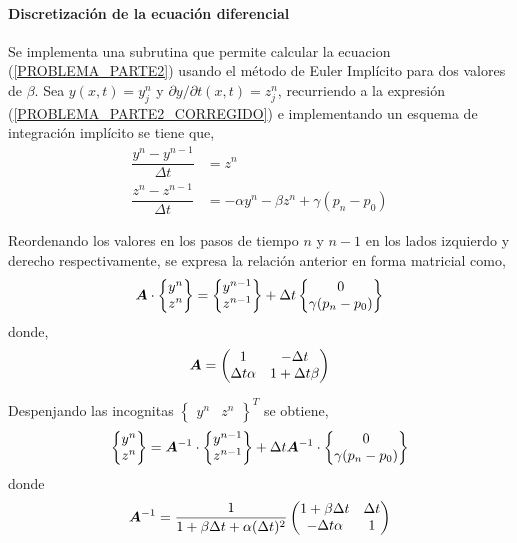 \paragraph{Discretización de la ecuación diferencial}
Se implementa una subrutina que permite calcular la ecuacion (\ref{PROBLEMA_PARTE2}) usando el método de Euler Implícito para dos valores de $\beta$. Sea $y(x,t) = y^n_j$ y $\partial y / \partial t (x,t) = z^n_j$, recurriendo a la expresión (\ref{PROBLEMA_PARTE2_CORREGIDO}) e implementando un esquema de integración implícito se tiene que,
\begin{align}
\dfrac{y^n - y^{n-1}}{\Delta t} &= z^n \\
\dfrac{z^n - z^{n-1}}{\Delta t} &= -\alpha y^n - \beta z^n + \gamma (p_n-p_0)
\end{align}

Reordenando los valores en los pasos de tiempo $n$ y $n-1$ en los lados izquierdo y derecho respectivamente, se expresa la relación anterior en forma matricial como,
\begin{equation}
\boldsymbol{A} \cdot \begin{Bmatrix}
y^n \\ z^n
\end{Bmatrix} =
\begin{Bmatrix}
y^{n-1} \\ z^{n-1}
\end{Bmatrix} +
\Delta t \begin{Bmatrix}
0 \\ \gamma (p_n-p_0)
\end{Bmatrix}
\end{equation}
donde,
\begin{equation}
\boldsymbol{A} = \begin{pmatrix}
1 & -\Delta t \\
\Delta t \alpha & 1+ \Delta t \beta
\end{pmatrix}
\end{equation}

Despenjando las incognitas $\begin{Bmatrix} y^n & z^n \end{Bmatrix} ^T$ se obtiene,
\begin{equation}
\begin{Bmatrix}
y^n \\ z^n
\end{Bmatrix} =
\boldsymbol{A}^{-1} \cdot \begin{Bmatrix}
y^{n-1} \\ z^{n-1}
\end{Bmatrix} +
\Delta t \boldsymbol{A}^{-1} \cdot  \begin{Bmatrix}
0 \\ \gamma (p_n-p_0)
\end{Bmatrix}
\end{equation}
donde
\begin{equation}
\boldsymbol{A}^{-1} = 
\dfrac{1}{1 + \beta \Delta t + \alpha (\Delta t) ^ 2}
\begin{pmatrix}
1+\beta \Delta t & \Delta t \\
-\Delta t \alpha & 1 
\end{pmatrix}
\end{equation}

